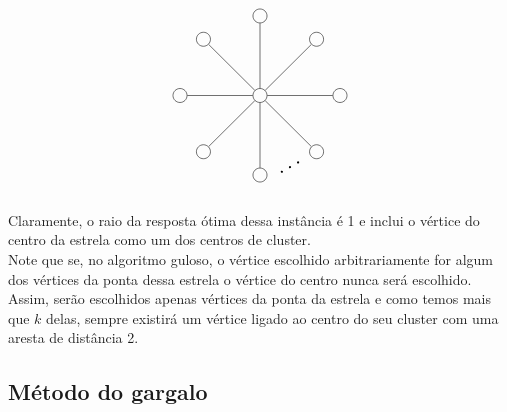 \documentclass[12pt]{article}
\begin{document}
    \[
    \begin{tikzpicture}
        \def\n{8}
        
        \def\r{2cm}
        
        \def\rotationangle{90}
        
        \draw (0,0) node[circle, draw, minimum size=10pt, inner sep=1.5pt] (center) {};
        
        \begin{scope}[rotate=\rotationangle]
          \foreach \i in {1,...,\n} {
            \draw (\i*360/\n:\r) node[circle, draw, minimum size=10pt, inner sep=1.5pt] (\i) {};
          }
        \end{scope}
        
        \foreach \i in {1,...,\n} {
          \draw (center) -- (\i);
        }
        \draw (4) node[shift={(0.75,0.2)}] {\rotatebox{30}{\scalebox{1.5}{$\ldots$}}} (4);
      \end{tikzpicture}
      \] \\
      Claramente, o raio da resposta ótima dessa instância é 1 e inclui o vértice do centro da estrela como um dos centros de cluster. \\
      Note que se, no algoritmo guloso, o vértice escolhido arbitrariamente for algum dos vértices da ponta dessa estrela o vértice do centro nunca será escolhido. Assim, serão escolhidos apenas vértices da ponta da estrela e como temos mais que $k$ delas, sempre existirá um vértice ligado ao centro do seu cluster com uma aresta de distância 2.
\newpage
\subsection{Método do gargalo}
\newpage


\end{document}
